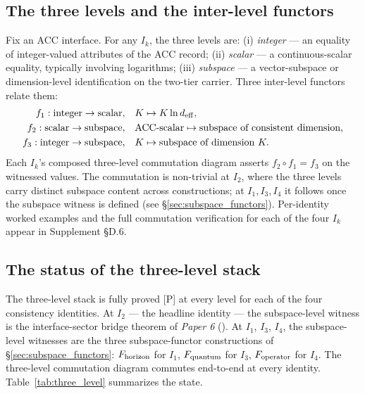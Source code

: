 \documentclass[11pt]{article}
\newcommand{\paperref}[2]{\emph{Paper #1} (\emph{#2})}
\begin{document}
\subsection{The three levels and the inter-level functors}\label{sec:three_level_functors}

Fix an ACC interface.  For any $I_k$, the three levels are: (i) \emph{integer} --- an equality of integer-valued attributes of the ACC record; (ii) \emph{scalar} --- a continuous-scalar equality, typically involving logarithms; (iii) \emph{subspace} --- a vector-subspace or dimension-level identification on the two-tier carrier.  Three inter-level functors relate them:
\begin{align*}
f_1 : \text{integer} \to \text{scalar},\quad & K \mapsto K \ln d_{\rm eff}, \\
f_2 : \text{scalar}  \to \text{subspace},\quad & \mathrm{ACC}\text{-scalar} \mapsto \text{subspace of consistent dimension}, \\
f_3 : \text{integer} \to \text{subspace},\quad & K \mapsto \text{subspace of dimension } K.
\end{align*}
Each $I_k$'s composed three-level commutation diagram asserts $f_2 \circ f_1 = f_3$ on the witnessed values.  The commutation is non-trivial at $I_2$, where the three levels carry distinct subspace content across constructions; at $I_1, I_3, I_4$ it follows once the subspace witness is defined (see \S\ref{sec:subspace_functors}).  Per-identity worked examples and the full commutation verification for each of the four $I_k$ appear in Supplement \S D.6.

\subsection{The status of the three-level stack}\label{sec:three_level_status}

The three-level stack is fully proved [P] at every level for each of the four consistency identities. At $I_2$ --- the headline identity --- the subspace-level witness is the interface-sector bridge theorem of \paperref{6}{}. At $I_1$, $I_3$, $I_4$, the subspace-level witnesses are the three subspace-functor constructions of \S\ref{sec:subspace_functors}: $F_{\rm horizon}$ for $I_1$, $F_{\rm quantum}$ for $I_3$, $F_{\rm operator}$ for $I_4$. The three-level commutation diagram commutes end-to-end at every identity. Table~\ref{tab:three_level} summarizes the state.
\end{document}
